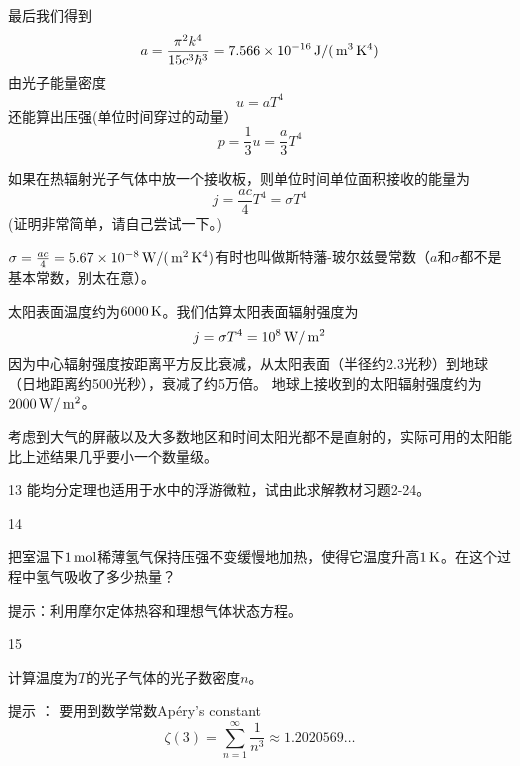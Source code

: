 \documentclass[CJK]{beamer}
\begin{document}
\begin{frame}
\bch
{\small 
最后我们得到
$$a = \frac{\pi^2 k^4}{15c^3\hbar^3} = 7.566 \times 10^{-16} \,\mathrm{J}/(\,\mathrm{m}^3\,\mathrm{K}^4) $$
由光子能量密度
$$u = a T^4$$
还能算出压强(单位时间穿过的动量）
$$p = \frac{1}{3}u = \frac{a}{3} T^4$$
}
\ech
\end{frame}


\begin{frame}
\bch
{\small 
如果在热辐射光子气体中放一个接收板，则单位时间单位面积接收的能量为
$$j = \frac{ac}{4}T^4 = \sigma T^4 $$
{\scriptsize (证明非常简单，请自己尝试一下。)}

$\sigma = \frac{ac}{4} = 5.67 \times 10^{-8} \,\mathrm{W}/(\,\mathrm{m}^2 \,\mathrm{K}^4)$有时也叫做斯特藩-玻尔兹曼常数（$a$和$\sigma$都不是基本常数，别太在意）。
}
\ech
\end{frame}

\begin{frame}
\bch

太阳表面温度约为$6000\,\mathrm{K}$。我们估算太阳表面辐射强度为
$$j = \sigma T^4 = 10^8 \,\mathrm{W}/\,\mathrm{m}^2 $$
因为中心辐射强度按距离平方反比衰减，从太阳表面（半径约2.3光秒）到地球（日地距离约500光秒），衰减了约5万倍。
地球上接收到的太阳辐射强度约为$2000\,\mathrm{W}/\,\mathrm{m}^2$。


考虑到大气的屏蔽以及大多数地区和时间太阳光都不是直射的，实际可用的太阳能比上述结果几乎要小一个数量级。

\ech
\end{frame}


\begin{frame}
\bch
\bitem
\item[13]{能均分定理也适用于水中的浮游微粒，试由此求解教材习题2-24。}
\item[14]{把室温下$1\,\mathrm{mol}$稀薄氢气保持压强不变缓慢地加热，使得它温度升高$1\,\mathrm{K}$。在这个过程中氢气吸收了多少热量？

\scriptsize
提示：利用摩尔定体热容和理想气体状态方程。
}
\item[15]{计算温度为$T$的光子气体的光子数密度$n$。

\skipline

{\scriptsize 提示 ： 要用到数学常数Ap{\'e}ry's constant
$$\zeta(3) = \sum_{n=1}^\infty \frac{1}{n^3} \approx 1.2020569\ldots $$}}
\eitem
\ech
\end{frame}
\end{document}
